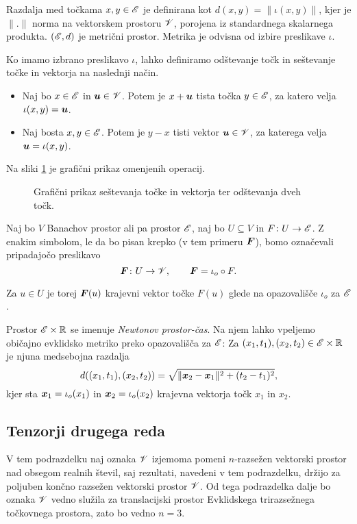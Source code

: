 Razdalja med točkama $x,y\in\mathscr E$ je definirana kot $d(x,y)=\|\iota(x,y)\|$, kjer je $\|.\|$ norma na
vektorskem prostoru $\mathscr V$, porojena iz standardnega skalarnega produkta. $(\mathscr E,d)$ je metrični prostor.
Metrika je odvisna od izbire preslikave $\iota$.

Ko imamo izbrano preslikavo $\iota$, lahko definiramo odštevanje točk in sešte\-vanje točke in vektorja
na naslednji način. \label{seto}
\begin{itemize}
	\item Naj bo $x\in\mathscr E$ in $\boldsymbol u\in\mathscr V$. Potem je $x+\boldsymbol u$ tista točka $y\in\mathscr E$, za
	katero velja $\iota(x,y)=\boldsymbol u$.
	\item Naj bosta $x,y\in\mathscr E$. Potem je $y-x$ tisti vektor $\boldsymbol u\in\mathscr V$, za katerega
	velja $\boldsymbol u=\iota(x,y)$.
\end{itemize}
Na sliki \ref{pic:evk} je grafični prikaz omenjenih operacij.
\begin{figure}[h] \begin{center}
	
	\caption{Grafični prikaz seštevanja točke in vektorja ter odštevanja dveh točk.}
	\label{pic:evk}
\end{center} \end{figure}

\begin{dogovor} \label{d:dogovor}
	Naj bo $V$ Banachov prostor ali pa prostor $\mathscr E$, naj bo $U\subseteq V$ in
	$F\colon U\to \mathscr E$. Z enakim simbolom, le da bo pisan krepko (v tem primeru $\boldsymbol F$),
	bomo označevali pripadajočo preslikavo
	\[
		\boldsymbol F\colon U\to\mathscr V,\qquad \boldsymbol F=\iota_o\circ F.
	\]
\end{dogovor}
Za $u\in U$ je torej $\boldsymbol F(u)$ krajevni vektor točke $F(u)$ glede na opazovališče $\iota_o$ za $\mathscr E$.

Prostor $\mathscr E\times\mathbb R$ se imenuje \emph{Newtonov prostor-čas}. Na njem lahko vpeljemo običajno evklidsko
metriko preko opazovališča za $\mathscr E$: Za $(x_1,t_1),(x_2,t_2)\in\mathscr E\times\mathbb R$ je njuna
medsebojna razdalja
\[
	d((x_1,t_1),(x_2,t_2))=\sqrt{\|\boldsymbol x_2-\boldsymbol x_1\|^2+(t_2-t_1)^2},
\]
kjer sta $\boldsymbol x_1=\iota_o(x_1)$ in $\boldsymbol x_2=\iota_o(x_2)$ krajevna vektorja točk $x_1$ in $x_2$.


\subsection{Tenzorji drugega reda} \label{pdrten2}


V tem podrazdelku naj oznaka $\mathscr V$ izjemoma pomeni $n$-razsežen vektorski prostor nad
obsegom realnih števil, saj rezultati, navedeni v tem podrazdelku, držijo za poljuben
končno razsežen vektorski prostor $\mathscr V$. Od tega podrazdelka dalje bo oznaka $\mathscr V$ vedno
služila za translacijski prostor Evklidskega trirazsežnega točkovnega prostora, zato bo vedno $n=3$.

